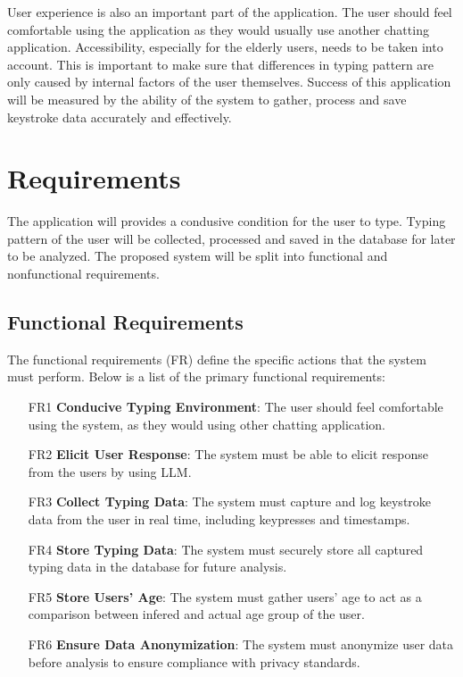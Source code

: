 User experience is also an important part of the application.
The user should feel comfortable using the application as they would usually use another chatting application.
Accessibility, especially for the elderly users, needs to be taken into account.
This is important to make sure that differences in typing pattern are only caused by internal factors of the user themselves.
Success of this application will be measured by the ability of the system to gather, process and save keystroke data accurately and effectively.

\section{Requirements}


The application will provides a condusive condition for the user to type.
Typing pattern of the user will be collected, processed and saved in the database for later to be analyzed.
The proposed system will be split into functional and nonfunctional requirements.

\subsection{Functional Requirements}


The functional requirements (FR) define the specific actions that the system must perform. 
Below is a list of the primary functional requirements:

\begin{itemize} 
    \item [FR1] \textbf{Conducive Typing Environment}: The user should feel comfortable using the system, as they would using other chatting application.
    \item [FR2] \textbf{Elicit User Response}: The system must be able to elicit response from the users by using \ac{LLM}. 
    \item [FR3] \textbf{Collect Typing Data}: The system must capture and log keystroke data from the user in real time, including keypresses and timestamps. 
    \item [FR4] \textbf{Store Typing Data}: The system must securely store all captured typing data in the database for future analysis. 
    \item [FR5] \textbf{Store Users' Age}: The system must gather users' age to act as a comparison between infered and actual age group of the user. 
    \item [FR6] \textbf{Ensure Data Anonymization}: The system must anonymize user data before analysis to ensure compliance with privacy standards. 
\end{itemize}

